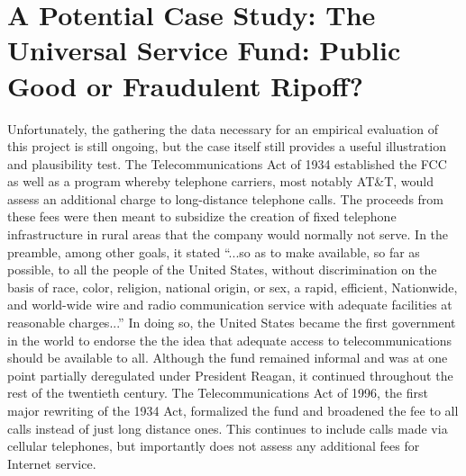 \documentclass[12pt]{article}
\begin{document}
	\section{A Potential Case Study: The Universal Service Fund: Public Good or Fraudulent Ripoff?}
	Unfortunately, the gathering the data necessary for an empirical evaluation of this project is still ongoing, but the case itself still provides a useful illustration and plausibility test. The Telecommunications Act of 1934 established the FCC as well as a program whereby telephone carriers, most notably AT\&T, would assess an additional charge to long-distance telephone calls. The proceeds from these fees were then meant to subsidize the creation of fixed telephone infrastructure in rural areas that the company would normally not serve. In the preamble, among other goals, it stated ``...so as to make available, so far as possible, to all the people of the United States, without
	discrimination on the basis of race, color, religion, national origin, or sex, a rapid, efficient, Nationwide,
	and world-wide wire and radio communication service with adequate facilities at reasonable
	charges...'' In doing so, the United States became the first government in the world to endorse the the idea that adequate access to telecommunications should be available to all. Although the fund remained informal and was at one point partially deregulated under President Reagan, it continued throughout the rest of the twentieth century. The Telecommunications Act of 1996, the first major rewriting of the 1934 Act, formalized the fund and broadened the fee to all calls instead of just long distance ones. This continues to include calls made via cellular telephones, but importantly does not assess any additional fees for Internet service.
	
\end{document}
